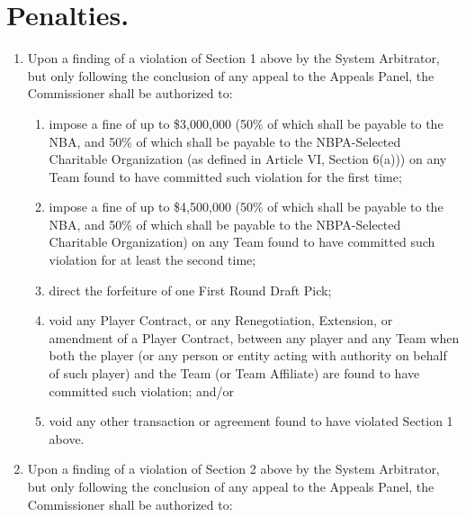 \documentclass[
]{book}
\providecommand{\tightlist}{%
  \setlength{\itemsep}{0pt}\setlength{\parskip}{0pt}}
\begin{document}
\hypertarget{penalties.}{%
\section{Penalties.}\label{penalties.}}

\begin{enumerate}
\def\labelenumi{(\alph{enumi})}
\tightlist
\item
  Upon a finding of a violation of Section 1 above by the System Arbitrator, but only following the conclusion of any appeal to the Appeals Panel, the Commissioner shall be authorized to:

  \begin{enumerate}
  \def\labelenumii{(\roman{enumii})}
  \tightlist
  \item
    impose a fine of up to \$3,000,000 (50\% of which shall be payable to the NBA, and 50\% of which shall be payable to the NBPA-Selected Charitable Organization (as defined in Article VI, Section 6(a))) on any Team found to have committed such violation for the first time;
  \item
    impose a fine of up to \$4,500,000 (50\% of which shall be payable to the NBA, and 50\% of which shall be payable to the NBPA-Selected Charitable Organization) on any Team found to have committed such violation for at least the second time;
  \item
    direct the forfeiture of one First Round Draft Pick;
  \item
    void any Player Contract, or any Renegotiation, Extension, or amendment of a Player Contract, between any player and any Team when both the player (or any person or entity acting with authority on behalf of such player) and the Team (or Team Affiliate) are found to have committed such violation; and/or
  \item
    void any other transaction or agreement found to have violated Section 1 above.
  \end{enumerate}
\item
  Upon a finding of a violation of Section 2 above by the System Arbitrator, but only following the conclusion of any appeal to the Appeals Panel, the Commissioner shall be authorized to:


\end{enumerate}
\end{document}
